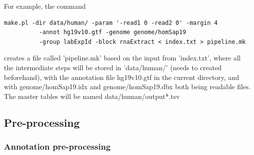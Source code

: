 \documentclass{article}
\begin{document}
For example, the command
\begin{verbatim}
make.pl -dir data/human/ -param '-read1 0 -read2 0' -margin 4 
          -annot hg19v10.gtf -genome genome/homSap19 
          -group labExpId -block rnaExtract < index.txt > pipeline.mk
\end{verbatim}
creates a file called 'pipeline.mk' based on the input from 'index.txt', where all the intermediate steps will be stored in 'data/human/' (needs 
to created beforehand), with the annotation file hg19v10.gtf in the current directory, and with genome/homSap19.idx and genome/homSap19.dbx both 
being readable files. The master tables will be named data/human/output*.tsv


\subsection{Pre-processing}

\subsubsection{Annotation pre-processing}
\label{sec::preprocessing}
\end{document}
